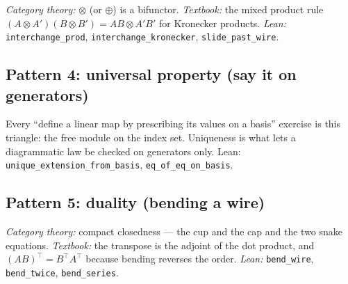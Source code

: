 \documentclass[11pt]{article}
\theoremstyle{definition}
\theoremstyle{plain}
\theoremstyle{remark}
\newcommand{\lean}[1]{\texttt{\small #1}}
\begin{document}
\noindent
\emph{Category theory:} $\otimes$ (or $\oplus$) is a bifunctor.
\emph{Textbook:} the mixed product rule $(A\otimes A')(B\otimes B') = AB \otimes
A'B'$ for Kronecker products.  \emph{Lean:} \lean{interchange\_prod},
\lean{interchange\_kronecker}, \lean{slide\_past\_wire}.

\subsection{Pattern 4: universal property (say it on generators)}

\begin{center}
\end{center}

\noindent
Every ``define a linear map by prescribing its values on a basis'' exercise is
this triangle: the free module on the index set.  Uniqueness is what lets a
diagrammatic law be checked on generators only.  Lean:
\lean{unique\_extension\_from\_basis}, \lean{eq\_of\_eq\_on\_basis}.

\subsection{Pattern 5: duality (bending a wire)}

\begin{center}
\end{center}

\noindent
\emph{Category theory:} compact closedness --- the cup and the cap and the two
snake equations.  \emph{Textbook:} the transpose is the adjoint of the dot
product, and $(AB)^{\!\top} = B^{\!\top}A^{\!\top}$ because bending reverses the
order.  \emph{Lean:} \lean{bend\_wire}, \lean{bend\_twice}, \lean{bend\_series}.
\end{document}
